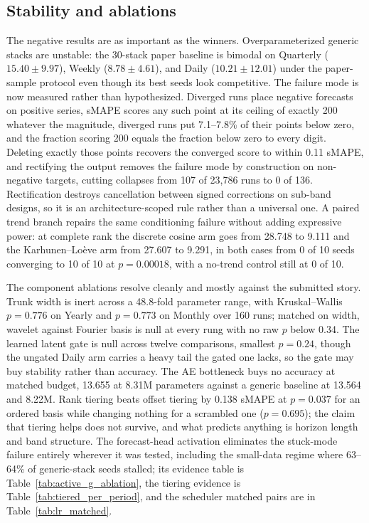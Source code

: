 \subsection{Stability and ablations}
\label{sec:results:stability}

The negative results are as important as the winners. Overparameterized
generic stacks are unstable: the 30-stack paper baseline is bimodal on
Quarterly ($15.40 \pm 9.97$), Weekly ($8.78 \pm 4.61$), and Daily
($10.21 \pm 12.01$) under the paper-sample protocol even though its best
seeds look competitive. The failure mode is now measured rather than
hypothesized. Diverged runs place negative forecasts on positive series,
sMAPE scores any such point at its ceiling of exactly 200 whatever the
magnitude, diverged runs put 7.1--7.8\% of their points below zero, and
the fraction scoring 200 equals the fraction below zero to every digit.
Deleting exactly those points recovers the converged score to within
0.11 sMAPE, and rectifying the output removes the failure mode by
construction on non-negative targets, cutting collapses from 107 of
23{,}786 runs to 0 of 136. Rectification destroys cancellation between
signed corrections on sub-band designs, so it is an architecture-scoped
rule rather than a universal one. A paired trend branch repairs the same
conditioning failure without adding expressive power: at complete rank
the discrete cosine arm goes from 28.748 to 9.111 and the
Karhunen--Lo\`eve arm from 27.607 to 9.291, in both cases from 0 of 10
seeds converging to 10 of 10 at $p = 0.00018$, with a no-trend control
still at 0 of 10.

The component ablations resolve cleanly and mostly against the submitted
story. Trunk width is inert across a 48.8-fold parameter range, with
Kruskal--Wallis $p = 0.776$ on Yearly and $p = 0.773$ on Monthly over
160 runs; matched on width, wavelet against Fourier basis is null at
every rung with no raw $p$ below 0.34. The learned latent gate is null
across twelve comparisons, smallest $p = 0.24$, though the ungated Daily
arm carries a heavy tail the gated one lacks, so the gate may buy
stability rather than accuracy. The AE bottleneck buys no accuracy at
matched budget, 13.655 at 8.31M parameters against a generic baseline at
13.564 and 8.22M. Rank tiering beats offset tiering by 0.138 sMAPE at
$p = 0.037$ for an ordered basis while changing nothing for a scrambled
one ($p = 0.695$); the claim that tiering helps does not survive, and
what predicts anything is horizon length and band structure. The
forecast-head activation eliminates the stuck-mode failure entirely
wherever it was tested, including the small-data regime where 63--64\%
of generic-stack seeds stalled; its evidence table is
Table~\ref{tab:active_g_ablation}, the tiering evidence is
Table~\ref{tab:tiered_per_period}, and the scheduler matched pairs are
in Table~\ref{tab:lr_matched}.

